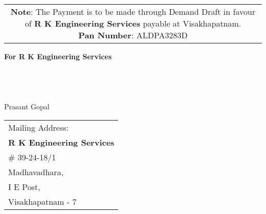 \documentclass[11pt]{article}
\begin{document}
\vspace*{-1 cm}
\begin{tabular}{c}
\parbox{4in}{ {\bf Note}: The Payment is to be made through Demand Draft in favour of {\bf R K Engineering Services} payable at Visakhapatnam. \\
{\noindent \bf Pan Number}:  ALDPA3283D }\\
\end{tabular}
\vspace*{55pt}


{\bf For  R K Engineering Services } \\ \\ \\ \\ \\
 \hspace*{0.6cm}Prasant Gopal
\vspace*{-71pt}
\begin{flushright}
\begin{tabular}{l}
Mailing Address:\\
{\bf R K Engineering Services}\\
\# 39-24-18/1\\
Madhavadhara, \\ 
I E Post, \\
Visakhapatnam - 7\\
\end{tabular}
\end{flushright}
\end{document}
